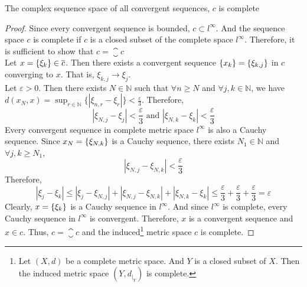 \begin{theorem}
	The complex sequence space of all convergent sequences, $c$ is complete
\end{theorem}
\begin{proof}
	Since every convergent sequence is bounded, $c \subset l^\infty$.
	And the sequence space $c$ is complete if $c$ is a closed subset of the complete space $l^\infty$.
	Therefore, it is sufficient to show that $c = \closure{c}$\\

	Let $x = \left\{\xi_k\right\} \in \overline{c}$.	
	Then there exists a convergent sequence $\left\{x_k\right\} = \left\{\xi_{k,j}\right\}$ in $c$ converging to $x$.
	That is, $\xi_{k,j} \to \xi_j$.\\

	Let $\varepsilon > 0$.
	Then there exists $N \in \mathbb{N}$ such that $\forall n \ge N$ and $\forall j,k \in \mathbb{N}$, we have $\displaystyle d(x_N,x) = \sup_{r \in \mathbb{N}} \{ |\xi_{n,r} - \xi_r| \} < \frac{\varepsilon}{3}$.
	Therefore,
	\begin{equation}
		|\xi_{N,j} - \xi_j| < \frac{\varepsilon}{3} \text{ and } |\xi_{N,k} - \xi_k| < \frac{\varepsilon}{3} 
	\end{equation}
	Every convergent sequence in complete metric space $l^\infty$ is also a Cauchy sequence.
	Since $x_N = \left\{\xi_{N,k}\right\}$ is a Cauchy sequence, there exists $N_1 \in \mathbb{N}$ and $\forall j,k \ge N_1$,
	\begin{equation}
		|\xi_{N,j} - \xi_{N,k}| < \frac{\varepsilon}{3}
	\end{equation}
	Therefore,
	\[ |\xi_j - \xi_k| \le |\xi_j - \xi_{N,j}| + |\xi_{N,j}-\xi_{N,k}| + |\xi_{N,k} - \xi_k| \le \frac{\varepsilon}{3} + \frac{\varepsilon}{3} + \frac{\varepsilon}{3} = \varepsilon \]
	Clearly, $x = \left\{\xi_k\right\}$ is a Cauchy sequence in $l^\infty$.
	And since $l^\infty$ is complete, every Cauchy sequence in $l^\infty$ is convergent.
	Therefore, $x$ is a convergent sequence and $x \in c$.
	Thus, $c = \closure{c}$ and the induced\dag\footnote{
		Let $(X,d)$ be a complete metric space.
		And $Y$ is a closed subset of $X$.
		Then the induced metric space $(Y,d_{|_Y})$ is complete.}
	metric space $c$ is complete.
\end{proof}

